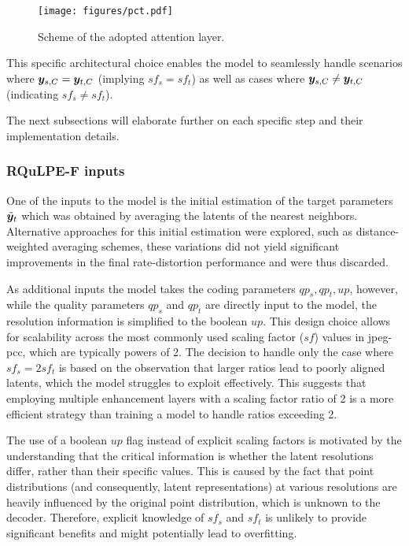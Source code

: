 \begin{figure*}
    \centering
    \texttt{[image: figures/pct.pdf]}
    \caption{Scheme of the adopted attention layer.}
    \label{fig:pct}
\end{figure*}


This specific architectural choice enables the model to seamlessly handle scenarios where $\y_{s, C}=\y_{t,C}$ (implying $sf_{s}=sf_t$) as well as cases where $\y_{s, C}\neq\y_{t,C}$ (indicating $sf_{s} \neq sf_t$).

The next subsections will elaborate further on each specific step and their implementation details.

\subsubsection{\textbf{RQuLPE-F inputs}}
One of the inputs to the model is the initial estimation of the target parameters $\Tilde{\y}_{t}$ which was obtained by averaging the latents of the nearest neighbors. Alternative approaches for this initial estimation were explored, such as distance-weighted averaging schemes, these variations did not yield significant improvements in the final rate-distortion performance and were thus discarded.

As additional inputs the model takes the coding parameters $qp_s, qp_t, up$, however, while the quality parameters $qp_s$ and $qp_t$ are directly input to the model, the resolution information is simplified to the boolean $up$. This design choice allows for scalability across the most commonly used scaling factor ($sf$) values in \gls{jpeg-pcc}, which are typically powers of 2. The decision to handle only the case where $sf_s=2sf_t$ is based on the observation that larger ratios lead to poorly aligned latents, which the model struggles to exploit effectively. This suggests that employing multiple enhancement layers with a scaling factor ratio of 2 is a more efficient strategy than training a model to handle ratios exceeding 2.

The use of a boolean $up$ flag instead of explicit scaling factors is motivated by the understanding that the critical information is whether the latent resolutions differ, rather than their specific values. This is caused by the fact that point distributions (and consequently, latent representations) at various resolutions are heavily influenced by the original point distribution, which is unknown to the decoder. Therefore, explicit knowledge of $sf_s$ and $sf_t$ is unlikely to provide significant benefits and might potentially lead to overfitting.

